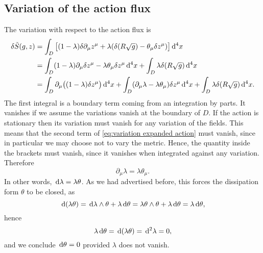 \documentclass[../main.tex]{subfiles}
\begin{document}
\subsection{Variation of the action flux}\label{sec:variationonaction}
The variation with respect to the action flux is
\begin{align}
	\delta \tilde{S}(g, z) & = \int_D \big[(1-\lambda) \delta \partial_\mu z^\mu +
\lambda(\delta(R\sqrt{g}) - \theta_\mu \delta z^\mu)\big] \,\mathrm{d}^4 x \notag \\						& = \int_D (1 - \lambda) \partial_\mu \delta z^\mu -
			\lambda \theta_\mu \delta z^\mu \,\mathrm{d}^4x + \int_D \lambda
			\delta(R \sqrt{g}) \,\mathrm{d}^4 x \notag \\
& = \int_{D} \partial_\mu \big((1 -
		\lambda)\delta z^\mu\big) \,\mathrm{d}^4 x + \int_D (\partial_\mu \lambda
		- \lambda\theta_\mu) \delta z^\mu \,\mathrm{d}^4 x + \int_D \lambda
		\delta(R \sqrt{g}) \,\mathrm{d}^4 x \label{eq:variation expanded
										action}. 
\end{align}
The first integral is a boundary term coming from an integration by parts. It vanishes
if we assume the variations vanish at the boundary of \( D \). If the action is stationary then its variation must vanish for any variation of the fields. This means that the second term of \cref{eq:variation expanded action} must vanish, since in particular we may choose not to vary the metric. Hence, the quantity inside the brackets must vanish, since it vanishes when integrated against any variation. Therefore
\begin{equation} \label{eq:action flux variation}
	\partial_\mu \lambda = \lambda\theta_\mu.
\end{equation}
In other words, \( \,\mathrm{d} \lambda = \lambda \theta \). As we had advertised before, this forces the dissipation form \(\theta\) to be closed, as
\begin{equation*}
	\,\mathrm{d}(\lambda \theta) = \,\mathrm{d} \lambda \wedge \theta + \lambda \,\mathrm{d} \theta = \lambda \theta
	\wedge \theta + \lambda \,\mathrm{d} \theta = \lambda \,\mathrm{d} \theta,
\end{equation*}
hence
\begin{equation*}
	\lambda \,\mathrm{d} \theta = \,\mathrm{d}(\lambda \theta) = \,\mathrm{d}^2 \lambda = 0,
\end{equation*}
and we conclude \( \,\mathrm{d} \theta = 0 \) provided \(\lambda\) does not vanish. 
\end{document}

